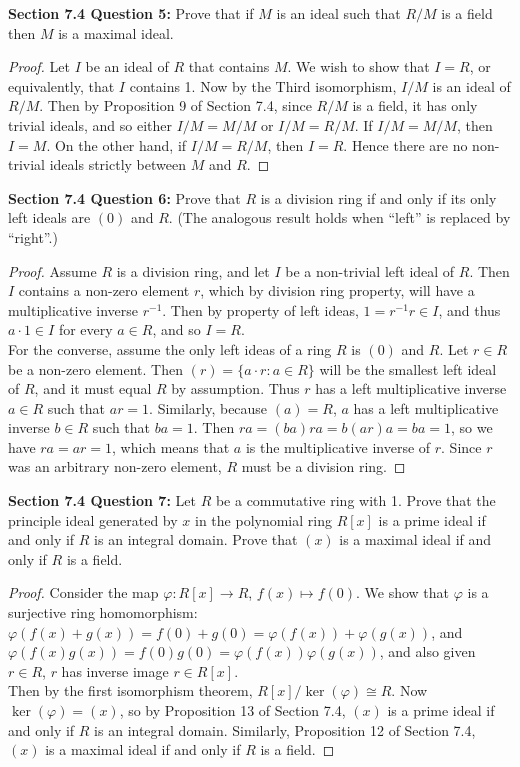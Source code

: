 \documentclass{article}
\begin{document}
\textbf{Section 7.4 Question 5:} Prove that if $M$ is an ideal such that
  $R/M$ is a field then $M$ is a maximal ideal.
  \begin{proof}
    Let $I$ be an ideal of $R$ that contains $M$. We wish to show that
    $I=R$, or equivalently, that $I$ contains 1. Now by the Third
    isomorphism, $I/M$ is an ideal of $R/M$. Then by Proposition 9 of
    Section 7.4, since $R/M$ is a field, it has only trivial ideals, and so
    either $I/M=M/M$ or $I/M=R/M$. If $I/M=M/M$, then $I=M$. On the other
    hand, if $I/M=R/M$, then $I=R$. Hence there are no non-trivial ideals
    strictly between $M$ and $R$.
  \end{proof}

\textbf{Section 7.4 Question 6:} Prove that $R$ is a division
  ring if and only if its only left ideals are $(0)$ and $R$. (The analogous
  result holds when ``left'' is replaced by ``right''.)
  \begin{proof}
    Assume $R$ is a division ring, and let $I$ be a non-trivial left ideal of
    $R$. Then $I$ contains a non-zero element $r$, which by division ring
    property, will have a multiplicative inverse $r^{-1}$. Then by property
    of left ideas, $1=r^{-1}r\in I$, and thus $a\cdot1\in I$ for every $a\in
    R$, and so $I=R$. \\

    For the converse, assume the only left ideas of a ring $R$ is $(0)$ and
    $R$. Let $r\in R$ be a non-zero element. Then $(r)=\{a\cdot r:a\in R\}$
    will be the smallest left ideal of $R$, and it must equal $R$ by
    assumption. Thus $r$ has a left multiplicative inverse $a\in R$ such that
    $ar=1$. Similarly, because $(a)=R$, $a$ has a left multiplicative inverse
    $b\in R$ such that $ba=1$. Then $ra=(ba)ra=b(ar)a=ba=1$, so we have
    $ra=ar=1$, which means that $a$ is the multiplicative inverse of $r$.
    Since $r$ was an arbitrary non-zero element, $R$ must be a division ring.
  \end{proof}

\textbf{Section 7.4 Question 7:} Let $R$ be a commutative ring with 1.
  Prove that the principle ideal generated by $x$ in the polynomial ring
  $R[x]$ is a prime ideal if and only if $R$ is an integral domain. Prove
  that $(x)$ is a maximal ideal if and only if $R$ is a field.

  \begin{proof}
    Consider the map $\varphi:R[x]\rightarrow R$, $f(x)\mapsto f(0)$. We
    show that $\varphi$ is a surjective ring homomorphism:
    $\varphi(f(x)+g(x)) =f(0)+g(0) = \varphi(f(x))+\varphi(g(x))$, and
    $\varphi(f(x)g(x)) =f(0)g(0) = \varphi(f(x))\varphi(g(x))$, and
    also given $r\in R$, $r$ has inverse image $r\in R[x]$. \\

    Then by the first isomorphism theorem, $R[x]/\ker(\varphi)\cong R$. Now
    $\ker(\varphi)=(x)$, so by Proposition 13 of Section 7.4, $(x)$ is a
    prime ideal if and only if $R$ is an integral domain. Similarly,
    Proposition 12 of Section 7.4, $(x)$ is a maximal ideal if and only if
    $R$ is a field.
  \end{proof}
\end{document}
